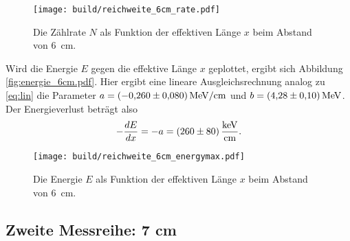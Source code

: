 \begin{figure}[H]
    \centering
    \texttt{[image: build/reichweite\_6cm\_rate.pdf]}
    \caption[short]{Die Zählrate $N$ als Funktion der effektiven Länge $x$ beim Abstand von \qty{6}{\cm}.}
    \label{fig:rate_6cm}
\end{figure}

\noindent


Wird die Energie $E$ gegen die effektive Länge $x$ geplottet, ergibt sich Abbildung \ref{fig:energie_6cm.pdf}.
Hier ergibt eine lineare Ausgleichsrechnung analog zu \eqref{eq:lin} die Parameter $a = \qty{-0.260 +- 0.080}{\mega\electronvolt\per\cm}$
und $b = \qty{4.28 +- 0.10}{\mega\electronvolt}$.
Der Energieverlust beträgt also 
\begin{align}
    - \frac{dE}{dx} = -a = \qty{260 +- 80}{\kilo\electronvolt\per\cm}.
\end{align}


\begin{figure}[H]
    \centering
    \texttt{[image: build/reichweite\_6cm\_energymax.pdf]}
    \caption[short]{Die Energie $E$ als Funktion der effektiven Länge $x$ beim Abstand von \qty{6}{\cm}.}
    \label{fig:energie_6cm}
\end{figure}



\subsection[]{Zweite Messreihe: 7 cm}
